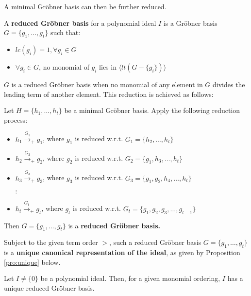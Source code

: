 A minimal Gr\"obner basis can then be further reduced.
\begin{Definition}
	A {\bf reduced Gr\"obner basis} for a polynomial ideal $I$ is a Gr\"obner basis $G=\{g_{1},\dots,g_{t}\}$ such that:
	\begin{itemize}
		\item $lc(g_{i})=1,\forall g_{i}\in G$
		\item $\forall g_{i} \in G$, no monomial of $g_{i}$ lies in $\langle lt(G-\{g_{i}\})\rangle$
	\end{itemize}
\end{Definition}
$G$ is a reduced Gr\"obner basis when no monomial of any element in $G$ 
divides the leading term of another element. 
This reduction is achieved as follows:

\begin{Definition}
Let $H = \{h_1, \ldots, h_t\}$ be a minimal Gr\"obner basis.  Apply
the following reduction process: 
\begin{itemize}
\item $h_1 \stackrel{G_1}{\textstyle\longrightarrow}_+ g_1$, where
  $g_1$ is reduced w.r.t. $G_1 = \{h_2, \ldots, h_t\}$

\item $h_2 \stackrel{G_2}{\textstyle\longrightarrow}_+ g_2$, where
  $g_2$ is reduced w.r.t. $G_2 = \{g_1, h_3, \ldots, h_t\}$
\item $h_3 \stackrel{G_3}{\textstyle\longrightarrow}_+ g_3$, where
  $g_3$ is reduced w.r.t. $G_3 = \{g_1, g_2, h_4, \ldots, h_t\}$

\hspace{0.25in} $\vdots$
\vspace{0.1in}
\item $h_t \stackrel{G_t}{\textstyle\longrightarrow}_+ g_t$, where
  $g_t$ is reduced w.r.t. $G_t = \{g_1, g_2, g_3, \ldots, g_{t-1}\}$
\end{itemize}
Then $G = \{g_1, \ldots, g_t\}$ is a {\bf reduced Gr\"obner basis.}
\end{Definition}


Subject to the given term order $>$, such a reduced Gr\"obner
  basis $G = \{g_1, \dots, g_t\}$ is a {\bf unique canonical
    representation of the ideal}, as 
given by Proposition \ref{pro:unique} below.


\begin{Proposition}\label{pro:unique} \cite{gb_book} 
Let $I \neq \{0\}$ be a polynomial ideal. Then, for a given monomial ordering, $I$ has a unique reduced Gr\"obner basis.
\end{Proposition}

